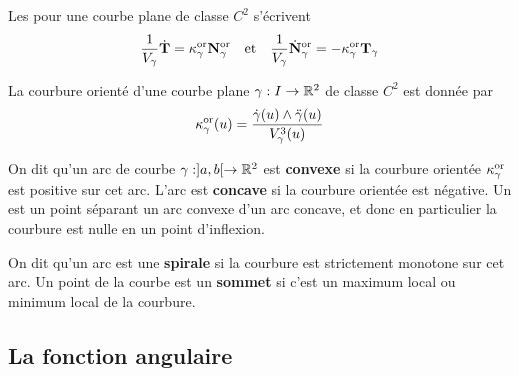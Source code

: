 \begin{proposition}
	Les  pour une courbe plane de classe $C^2$ s'écrivent
	\[
	\frac1{V_\gamma} \dot{\mathbf{T}} = \kappa_\gamma^{\operatorname{or}} \mathbf{N}_\gamma^{\operatorname{or}} \quad \text{et} \quad \frac{1}{V_\gamma} \dot{\mathbf{N}}_\gamma^{\operatorname{or}} = - \kappa_\gamma^{\operatorname{or}} \mathbf{T}_\gamma
	\]
\end{proposition}


\begin{proposition}
	La courbure orienté d'une courbe plane $\gamma : I \to \mathbb{R}^2$ de classe $C^2$ est donnée par
	\[
	\kappa_\gamma^{\operatorname{or}}(u) = \frac{\dot \gamma(u) \land \ddot \gamma(u)}{V_\gamma^3(u)}
	\]
\end{proposition}


\begin{definition}
	On dit qu'un arc de courbe $\gamma : ]a,b[ \to \mathbb{R}^2$ est \textbf{convexe} si la courbure orientée $\kappa_\gamma^{\operatorname{or}}$ est positive sur cet arc. L'arc est \textbf{concave} si la courbure orientée est négative. Un  est un point séparant un arc convexe d'un arc concave, et donc en particulier la courbure est nulle en un point d'inflexion.
	
	On dit qu'un arc est une \textbf{spirale} si la courbure est strictement monotone sur cet arc. Un point de la courbe est un \textbf{sommet} si c'est un maximum local ou minimum local de la courbure.
\end{definition}

\subsection{La fonction angulaire}

